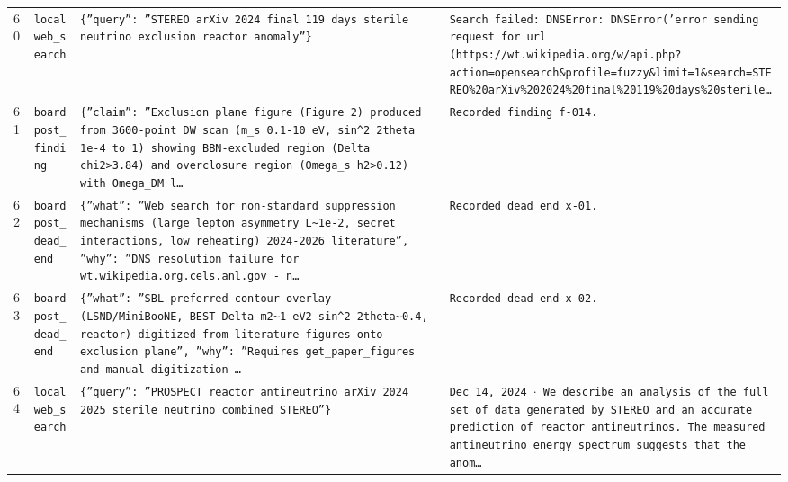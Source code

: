 \documentclass[11pt,a4paper]{article}
\begin{document}
\begin{longtable}{@{}p{}p{}p{}p{}@{}}
60 & \texttt{local}\newline\texttt{web\_\allowbreak{}search} & \texttt{\{''query'':\allowbreak{} ''STEREO arXiv 2024 final 119 days sterile neutrino exclusion reactor anomaly''\}\allowbreak{}} & \texttt{Search failed:\allowbreak{} DNSError:\allowbreak{} DNSError('error sending request for url (https:\allowbreak{}/\allowbreak{}/\allowbreak{}wt.wikipedia.org/\allowbreak{}w/\allowbreak{}api.php?action=\allowbreak{}opensearch\&profile=\allowbreak{}fuzzy\&limit=\allowbreak{}1\&search=\allowbreak{}STEREO\%20arXiv\%202024\%20final\%20119\%20days\%20sterile\ldots{}\allowbreak{}} \\
61 & \texttt{board}\newline\texttt{post\_\allowbreak{}finding} & \texttt{\{''claim'':\allowbreak{} ''Exclusion plane figure (Figure 2)\allowbreak{} produced from 3600-point DW scan (m\_\allowbreak{}s 0.1-10 eV,\allowbreak{} sin\textasciicircum{}\allowbreak{}2 2theta 1e-4 to 1)\allowbreak{} showing BBN-excluded region (Delta chi2\textgreater{}\allowbreak{}3.84)\allowbreak{} and overclosure region (Omega\_\allowbreak{}s h2\textgreater{}\allowbreak{}0.12)\allowbreak{} with Omega\_\allowbreak{}DM l\ldots{}\allowbreak{}} & \texttt{Recorded finding f-014.} \\
62 & \texttt{board}\newline\texttt{post\_\allowbreak{}dead\_\allowbreak{}end} & \texttt{\{''what'':\allowbreak{} ''Web search for non-standard suppression mechanisms (large lepton asymmetry L\textasciitilde{}\allowbreak{}1e-2,\allowbreak{} secret interactions,\allowbreak{} low reheating)\allowbreak{} 2024-2026 literature'',\allowbreak{} ''why'':\allowbreak{} ''DNS resolution failure for wt.wikipedia.org.cels.anl.gov - n\ldots{}\allowbreak{}} & \texttt{Recorded dead end x-01.} \\
63 & \texttt{board}\newline\texttt{post\_\allowbreak{}dead\_\allowbreak{}end} & \texttt{\{''what'':\allowbreak{} ''SBL preferred contour overlay (LSND/\allowbreak{}MiniBooNE,\allowbreak{} BEST Delta m2\textasciitilde{}\allowbreak{}1 eV2 sin\textasciicircum{}\allowbreak{}2 2theta\textasciitilde{}\allowbreak{}0.4,\allowbreak{} reactor)\allowbreak{} digitized from literature figures onto exclusion plane'',\allowbreak{} ''why'':\allowbreak{} ''Requires get\_\allowbreak{}paper\_\allowbreak{}figures and manual digitization \ldots{}\allowbreak{}} & \texttt{Recorded dead end x-02.} \\
64 & \texttt{local}\newline\texttt{web\_\allowbreak{}search} & \texttt{\{''query'':\allowbreak{} ''PROSPECT reactor antineutrino arXiv 2024 2025 sterile neutrino combined STEREO''\}\allowbreak{}} & \texttt{Dec 14,\allowbreak{} 2024 $\cdot$ We describe an analysis of the full set of data generated by STEREO and an accurate prediction of reactor antineutrinos. The measured antineutrino energy spectrum suggests that the anom\ldots{}\allowbreak{}} \\

\end{longtable}
\end{document}
